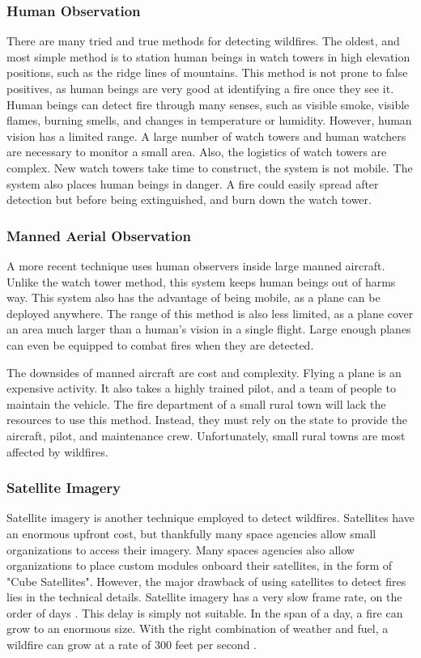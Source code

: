 \documentclass[12pt,journal,compsoc]{IEEEtran}
\begin{document}
\subsubsection{Human Observation}
There are many tried and true methods for detecting wildfires. The oldest, and most simple method is to station human beings in watch towers in high elevation positions, such as the ridge lines of mountains. This method is not prone to false positives, as human beings are very good at identifying a fire once they see it. Human beings can detect fire through many senses, such as visible smoke, visible flames, burning smells, and changes in temperature or humidity. However, human vision has a limited range. A large number of watch towers and human watchers are necessary to monitor a small area. Also, the logistics of watch towers are complex. New watch towers take time to construct, the system is not mobile. The system also places human beings in danger. A fire could easily spread after detection but before being extinguished, and burn down the watch tower.  

\subsubsection{Manned Aerial Observation}
A more recent technique uses human observers inside large manned aircraft. Unlike the watch tower method, this system keeps human beings out of harms way. This system also has the advantage of being mobile, as a plane can be deployed anywhere. The range of this method is also less limited, as a plane cover an area much larger than a human's vision in a single flight. Large enough planes can even be equipped to combat fires when they are detected. 

The downsides of manned aircraft are cost and complexity. Flying a plane is an expensive activity. It also takes a highly trained pilot, and a team of people to maintain the vehicle. The fire department of a small rural town will lack the resources to use this method. Instead, they must rely on the state to provide the aircraft, pilot, and maintenance crew. Unfortunately, small rural towns are most affected by wildfires. 

\subsubsection{Satellite Imagery}
Satellite imagery is another technique employed to detect wildfires. Satellites have an enormous upfront cost, but thankfully many space agencies allow small organizations to access their imagery. Many spaces agencies also allow organizations to place custom modules onboard their satellites, in the form of "Cube Satellites". However, the major drawback of using satellites to detect fires lies in the technical details. Satellite imagery has a very slow frame rate, on the order of days \cite{technique_review}. This delay is simply not suitable. In the span of a day, a fire can grow to an enormous size. With the right combination of weather and fuel, a wildfire can grow at a rate of 300 feet per second \cite{climate_and_wildfire}.
\end{document}
